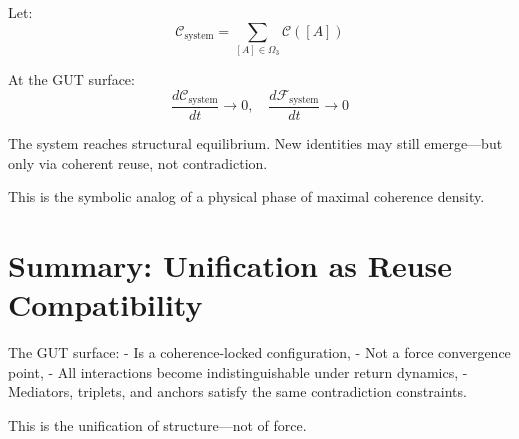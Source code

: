 Let:
\[
\mathcal{C}_{\text{system}} = \sum_{[A] \in \Omega_3} \mathcal{C}([A])
\]

At the GUT surface:
\[
\frac{d \mathcal{C}_{\text{system}}}{dt} \to 0,\quad
\frac{d \mathcal{F}_{\text{system}}}{dt} \to 0
\]

The system reaches structural equilibrium. New identities may still emerge—but only via coherent reuse, not contradiction.

This is the symbolic analog of a physical phase of maximal coherence density.

\section{Summary: Unification as Reuse Compatibility} \label{sec:gut-summary}

The GUT surface:
- Is a coherence-locked configuration,
- Not a force convergence point,
- All interactions become indistinguishable under return dynamics,
- Mediators, triplets, and anchors satisfy the same contradiction constraints.

This is the unification of structure—not of force.
